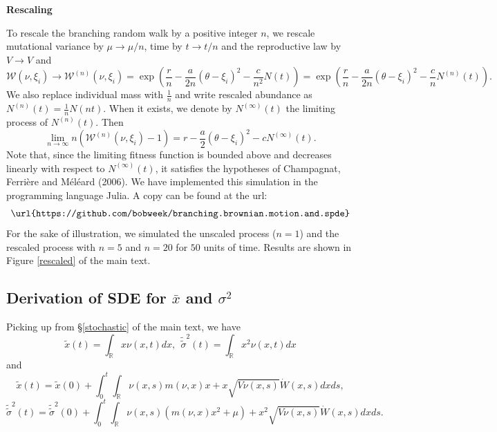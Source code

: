 \documentclass[]{article}
\begin{document}
\textbf{Rescaling}

To rescale the branching random walk by a positive integer \(n\), we
rescale mutational variance by \(\mu\to \mu/n\), time by \(t\to t/n\)
and the reproductive law by \(V\to V\) and \begin{equation}
\mathscr W(\nu,\xi_i)\to\mathscr W^{(n)}(\nu,\xi_i)=\exp\left(\frac{r}{n}-\frac{a}{2n}(\theta-\xi_i)^2-\frac{c}{n^2}N(t)\right)=\exp\left(\frac{r}{n}-\frac{a}{2n}(\theta-\xi_i)^2-\frac{c}{n}N^{(n)}(t)\right).
\end{equation} We also replace individual mass with \(\frac{1}{n}\) and
write rescaled abundance as \(N^{(n)}(t)=\frac{1}{n}N(nt)\). When it
exists, we denote by \(N^{(\infty)}(t)\) the limiting process of
\(N^{(n)}(t)\). Then \begin{equation}
\lim_{n\to\infty}n\left(\mathscr W^{(n)}(\nu,\xi_i)-1\right)=r-\frac{a}{2}(\theta-\xi_i)^2-cN^{(\infty)}(t).
\end{equation} Note that, since the limiting fitness function is bounded
above and decreases linearly with respect to \(N^{(\infty)}(t)\), it
satisfies the hypotheses of Champagnat, Ferrière and Méléard (2006). We
have implemented this simulation in the programming language Julia. A
copy can be found at the url:
\[\texttt{\url{https://github.com/bobweek/branching.brownian.motion.and.spde}}\]
For the sake of illustration, we simulated the unscaled process
(\(n=1\)) and the rescaled process with \(n=5\) and \(n=20\) for \(50\)
units of time. Results are shown in Figure \ref{rescaled} of the main
text.

\hypertarget{derivation-of-sde-for-bar-x-and-sigma2}{%
\subsection{\texorpdfstring{Derivation of SDE for \(\bar x\) and
\(\sigma^2\)
\label{SDE_DERIV}}{Derivation of SDE for \textbackslash{}bar x and \textbackslash{}sigma\^{}2 }}\label{derivation-of-sde-for-bar-x-and-sigma2}}

Picking up from \S\ref{stochastic} of the main text, we have
\begin{equation}
\tilde x(t)=\int_\mathbb{R}x\nu(x,t)dx, \ \ \tilde{\tilde\sigma}^2(t)=\int_\mathbb{R}x^2\nu(x,t)dx
\end{equation} and \begin{equation}\label{xtilde}
\tilde x(t)=\tilde x(0)+\int_0^t\int_\mathbb{R}\nu(x,s)m(\nu,x)x+x\sqrt{V\nu(x,s)}\dot W(x,s)dxds,
\end{equation} \begin{equation}\label{stilde}
\tilde{\tilde\sigma}^2(t)=\tilde{\tilde\sigma}^2(0)+\int_0^t\int_\mathbb{R}\nu(x,s)\left(m(\nu,x)x^2+\mu\right)+x^2\sqrt{V\nu(x,s)}\dot W(x,s)dxds.
\end{equation}
\end{document}
